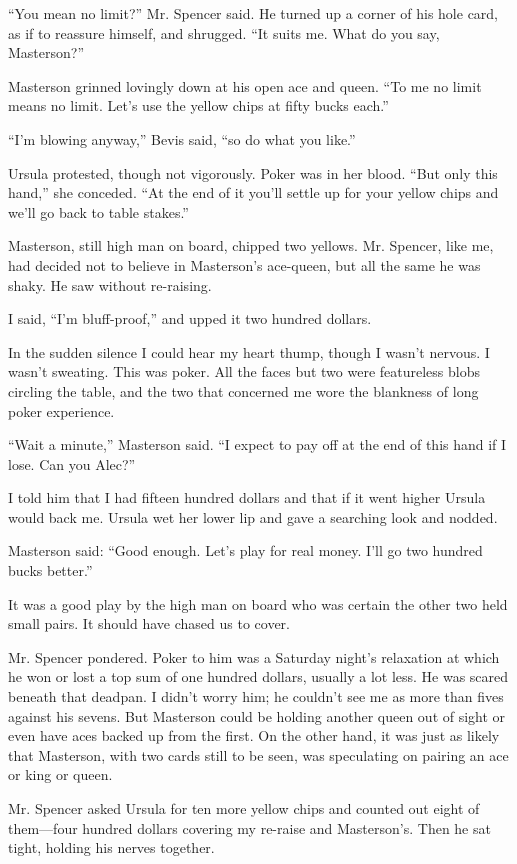 {“You mean no limit?” Mr. Spencer said. He turned up a corner of his hole card, as if to reassure himself, and shrugged. “It suits me. What do you say, Masterson?”

Masterson grinned lovingly down at his open ace and queen. “To me no limit means no limit. Let’s use the yellow chips at fifty bucks each.”

“I’m blowing anyway,” Bevis said, “so do what you like.”

Ursula protested, though not vigorously. Poker was in her blood. “But only this hand,” she conceded. “At the end of it you’ll settle up for your yellow chips and we’ll go back to table stakes.”

Masterson, still high man on board, chipped two yellows. Mr. Spencer, like me, had decided not to believe in Masterson’s ace-queen, but all the same he was shaky. He saw without re-raising.

I said, “I’m bluff-proof,” and upped it two hundred dollars.

In the sudden silence I could hear my heart thump, though I wasn’t nervous. I wasn’t sweating. This was poker. All the faces but two were featureless blobs circling the table, and the two that concerned me wore the blankness of long poker experience.

“Wait a minute,” Masterson said. “I expect to pay off at the end of this hand if I lose. Can you Alec?”

I told him that I had fifteen hundred dollars and that if it went higher Ursula would back me. Ursula wet her lower lip and gave a searching look and nodded.

Masterson said: “Good enough. Let’s play for real money. I’ll go two hundred bucks better.”

It was a good play by the high man on board who was certain the other two held small pairs. It should have chased us to cover.

Mr. Spencer pondered. Poker to him was a Saturday night’s relaxation at which he won or lost a top sum of one hundred dollars, usually a lot less. He was scared beneath that deadpan. I didn’t worry him; he couldn’t see me as more than fives against his sevens. But Masterson could be holding another queen out of sight or even have aces backed up from the first. On the other hand, it was just as likely that Masterson, with two cards still to be seen, was speculating on pairing an ace or king or queen.

Mr. Spencer asked Ursula for ten more yellow chips and counted out eight of them—four hundred dollars covering my re-raise and Masterson’s. Then he sat tight, holding his nerves together.

}
